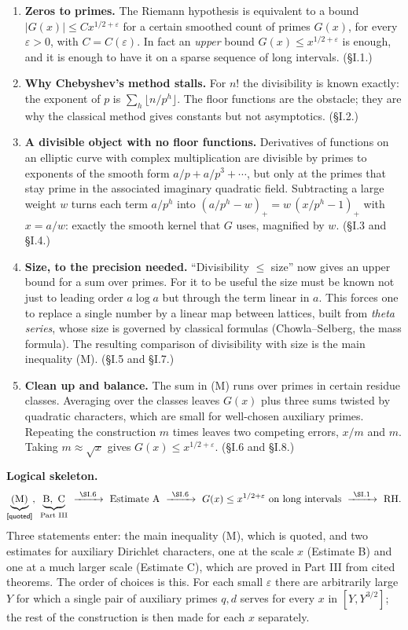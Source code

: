 \documentclass[11pt,letterpaper]{article}
\newcommand{\quoted}{\textsf{[quoted]}}
\begin{document}
\begin{enumerate}[leftmargin=2em]
\item \textbf{Zeros to primes.} The Riemann hypothesis is equivalent to a bound $|G(x)|\le Cx^{1/2+\varepsilon}$
for a certain smoothed count of primes $G(x)$, for every $\varepsilon>0$, with $C=C(\varepsilon)$. In fact an \emph{upper} bound $G(x)\le x^{1/2+\varepsilon}$
is enough, and it is enough to have it on a sparse sequence of long intervals. (\S I.1.)
\item \textbf{Why Chebyshev's method stalls.} For $n!$ the divisibility is known exactly: the exponent of $p$
is $\sum_h\lfloor n/p^h\rfloor$. The floor functions are the obstacle; they are why the classical method
gives constants but not asymptotics. (\S I.2.)
\item \textbf{A divisible object with no floor functions.} Derivatives of functions on an elliptic curve with
complex multiplication are divisible by primes to exponents of the smooth form $a/p+a/p^3+\cdots$, but only
at the primes that stay prime in the associated imaginary quadratic field. Subtracting a large weight $w$
turns each term $a/p^h$ into $(a/p^h-w)_+=w\,(x/p^h-1)_+$ with $x=a/w$: exactly the smooth kernel that $G$ uses,
magnified by $w$. (\S I.3 and \S I.4.)
\item \textbf{Size, to the precision needed.} ``Divisibility $\le$ size'' now gives an upper bound for a sum
over primes. For it to be useful the size must be known not just to leading order $a\log a$ but through the
term linear in $a$. This forces one to replace a single number by a linear map between lattices, built from
\emph{theta series}, whose size is governed by classical formulas (Chowla--Selberg, the mass formula).
The resulting comparison of divisibility with size is the main inequality (M). (\S I.5 and \S I.7.)
\item \textbf{Clean up and balance.} The sum in (M) runs over primes in certain residue classes.
Averaging over the classes leaves $G(x)$ plus three sums twisted by quadratic characters, which are small for
well-chosen auxiliary primes. Repeating the construction $m$ times leaves two competing errors, $x/m$ and
$m$. Taking $m\approx\sqrt x$ gives $G(x)\le x^{1/2+\varepsilon}$. (\S I.6 and \S I.8.)
\end{enumerate}

\noindent\textbf{Logical skeleton.}
\begin{equation}\label{D:1}
\underbrace{\text{(M)}}_{\text{\quoted}},\ \underbrace{\text{B},\ \text{C}}_{\text{Part III}}
\ \xrightarrow{\ \S\mathrm{I}.6\ }\ \text{Estimate A}
\ \xrightarrow{\ \S\mathrm{I}.6\ }\ G(x)\le x^{1/2+\varepsilon}\ \text{on long intervals}
\ \xrightarrow{\ \S\mathrm{I}.1\ }\ \text{RH}.
\end{equation}
Three statements enter: the main inequality (M), which is quoted, and two estimates for auxiliary
Dirichlet characters, one at the scale $x$ (Estimate B) and one at a much larger scale (Estimate C), which
are proved in Part III from cited theorems. The order of
choices is this. For each small $\varepsilon$ there are arbitrarily large $Y$ for which a single pair of
auxiliary primes $q,d$ serves for every $x$ in $[Y,Y^{3/2}]$; the rest of the construction is then made for
each $x$ separately.
\end{document}
